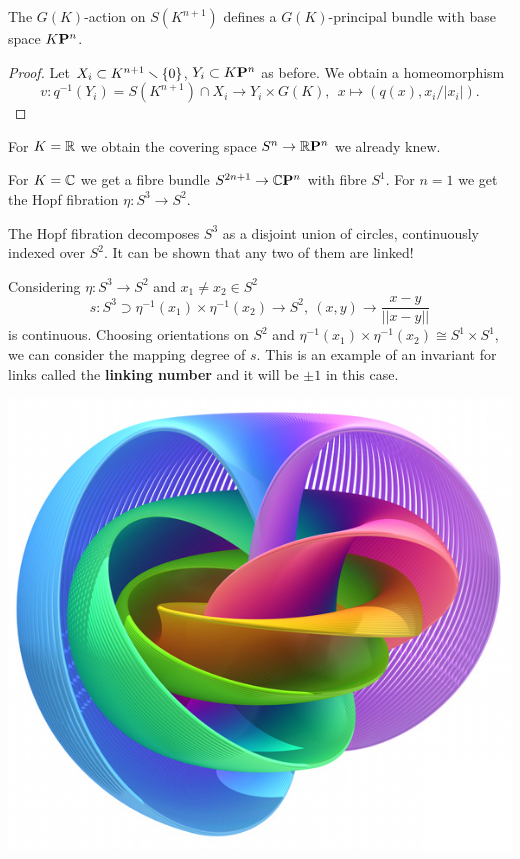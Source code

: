 \begin{proposition}
The $G(K)$-action on $S(K^{n+1})$ defines a $G(K)$-principal bundle with base space ${K\mathbf{P}^n}$.
\end{proposition}

\begin{proof}
Let $X_i\subset K^{n+1}\smallsetminus\{0\}$, $Y_i\subset {K\mathbf{P}^n}$ as before. We obtain a homeomorphism
\[v:q^{-1}(Y_i)=S(K^{n+1})\cap X_i\to Y_i\times G(K),\ \ x\mapsto (q(x),x_i/|x_i|).\]
\end{proof}

For $K={\mathbb R}$ we obtain the covering space $S^n\to{{\mathbb R}\mathbf{P}^n}$ we already knew.

For $K=\mathbb{C}$ we get a fibre bundle $S^{2n+1}\to{\mathbb{C}\mathbf{P}^n}$ with fibre $S^1$. For $n=1$ we get the Hopf fibration $\eta:S^3\to S^2$.

\begin{remark}
The Hopf fibration decomposes $S^3$ as a disjoint union of circles, continuously indexed over $S^2$.
It can be shown that any two of them are linked!

Considering $\eta:S^3\to S^2$ and $x_1\neq x_2\in S^2$
\[s:S^3\supset\eta^{-1}(x_1)\times\eta^{-1}(x_2)\to S^2,\ (x,y)\to\frac{x-y}{||x-y||}\]
is continuous. Choosing orientations on $S^2$ and $\eta^{-1}(x_1)\times\eta^{-1}(x_2)\cong S^1\times S^1$, we can consider the mapping degree of $s$. This is an example of an invariant for links called the \textbf{linking number} and it will be $\pm1$ in this case.
\end{remark}\smallskip

\begin{center}
    \includegraphics[scale=0.45]{Pictures/HopfFibration.jpg}
\end{center}

